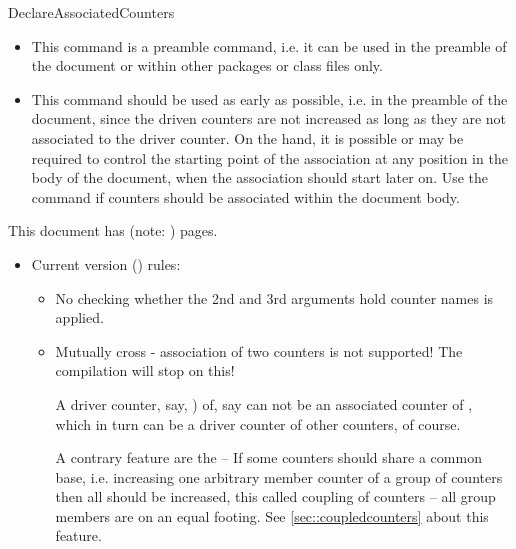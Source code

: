 \documentclass[12pt,a4paper,oneside]{article}
\makeatletter
\newcommand{\chdocextractversion}[1]{%
  \@nameuse{#1}%
}
\renewcommand{\tcbdocupdated}[1]{#1}%
\newcommand{\CHDocUpdate}[1]{\tcbdocmarginnote[doclang/updated={},colback={yellow},colframe={yellow!50!red},  fontupper={\tiny}
]{%
  \tcbdocupdated{\chdocextractversion{xassoccntversion#1}}%
}%
}
\def\packageversion{\xassoccntpackageversion}%
\newcounter{foobar}
\makeatother
\begin{document}
\begin{docCommand}{DeclareAssociatedCounters}{}
\begin{itemize}
\item This command is a preamble command, i.e. it can be used in the preamble of the document or within other packages or class files only. 
\item This command should be used as early as possible, i.e. in the preamble of the document, since the driven counters are not increased as long as they are not associated to the driver counter. On the hand, it is possible or may be required to control the starting point of the association at any position in the body of the document, when the association should start later on. Use the command  if counters should be associated within the document body. 
\end{itemize}


\renewcommand{\DeclareAssociatedCounters}[3][]{\relax}%
\begin{dispExample}
\DeclareAssociatedCounters{page}{totalpages,anothertotalpages}%
This document has \number{} (note: \number{}) pages.
\end{dispExample}

\begin{itemize}
  \item Current version (\packageversion) rules:
    \begin{itemize}
      \item No checking whether the 2nd and 3rd arguments hold counter names is applied.
      \item Mutually cross - association of two counters is not supported! The compilation will stop on this!
        \CHDocUpdate{0.6}

        A driver counter, say, ) of, say  can not be an associated counter of , which in turn can be a driver counter of other counters, of course. 

        A contrary feature are the  -- If some counters should share a common base, i.e. increasing one arbitrary member counter of a group of counters then all should be increased, this called coupling of counters -- all group members are on an equal footing. See \cref{sec::coupledcounters} about this feature. 


\end{itemize}
\end{itemize}
\end{docCommand}
\end{document}
